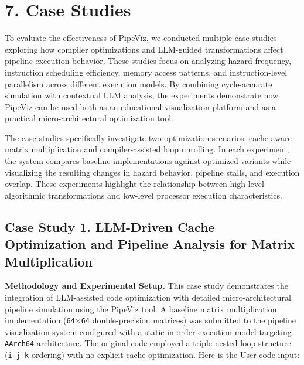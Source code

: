 \section*{7. Case Studies}

To evaluate the effectiveness of PipeViz, we conducted multiple case studies exploring how compiler optimizations and LLM-guided transformations affect pipeline execution behavior. These studies focus on analyzing hazard frequency, instruction scheduling efficiency, memory access patterns, and instruction-level parallelism across different execution models. By combining cycle-accurate simulation with contextual LLM analysis, the experiments demonstrate how PipeViz can be used both as an educational visualization platform and as a practical micro-architectural optimization tool.

The case studies specifically investigate two optimization scenarios: cache-aware matrix multiplication and compiler-assisted loop unrolling. In each experiment, the system compares baseline implementations against optimized variants while visualizing the resulting changes in hazard behavior, pipeline stalls, and execution overlap. These experiments highlight the relationship between high-level algorithmic transformations and low-level processor execution characteristics.

\subsection*{Case Study 1. LLM-Driven Cache Optimization and Pipeline Analysis for Matrix Multiplication}

\textbf{Methodology and Experimental Setup.} This case study demonstrates the integration of LLM-assisted code optimization with detailed micro-architectural pipeline simulation using the PipeViz tool. A baseline matrix multiplication implementation (\texttt{64$\times$64} double-precision matrices) was submitted to the pipeline visualization system configured with a static in-order execution model targeting \texttt{AArch64} architecture. The original code employed a triple-nested loop structure (\texttt{i-j-k} ordering) with no explicit cache optimization. Here is the User code input:

